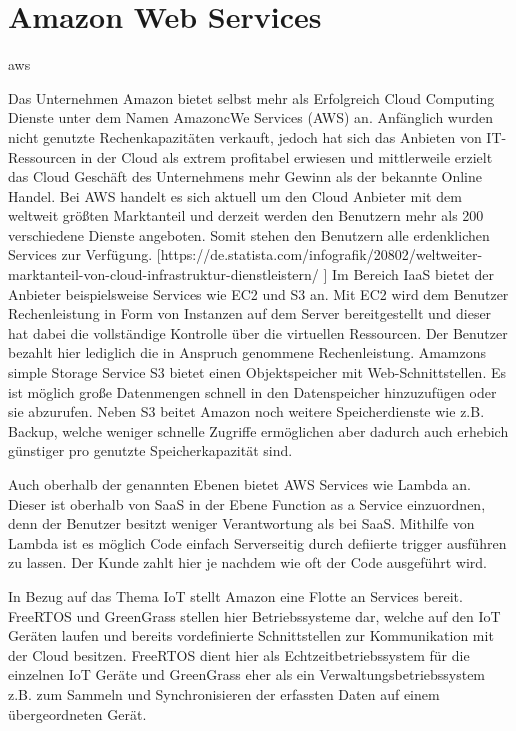 \chapter{Amazon Web Services}\label{ch:4}
\acrfull{aws}

Das Unternehmen Amazon bietet selbst mehr als Erfolgreich Cloud Computing Dienste unter dem Namen AmazoncWe Services (AWS) an. Anfänglich wurden nicht genutzte Rechenkapazitäten verkauft, jedoch hat sich das Anbieten von IT-Ressourcen in der Cloud als extrem profitabel erwiesen und mittlerweile erzielt das Cloud Geschäft des Unternehmens mehr Gewinn als der bekannte Online Handel. Bei AWS handelt es sich aktuell um den Cloud Anbieter mit dem weltweit größten Marktanteil und derzeit werden den Benutzern mehr als 200 verschiedene Dienste angeboten. Somit stehen den Benutzern alle erdenklichen Services zur Verfügung. [https://de.statista.com/infografik/20802/weltweiter-marktanteil-von-cloud-infrastruktur-dienstleistern/
] 
Im Bereich IaaS bietet der Anbieter beispielsweise Services wie EC2 und S3 an. Mit EC2 wird dem Benutzer Rechenleistung in Form von Instanzen auf dem Server bereitgestellt und dieser hat dabei die vollständige Kontrolle über die virtuellen Ressourcen. Der Benutzer bezahlt hier lediglich die in Anspruch genommene Rechenleistung. Amamzons simple Storage Service S3 bietet einen Objektspeicher mit Web-Schnittstellen. Es ist möglich große Datenmengen schnell in den Datenspeicher hinzuzufügen oder sie abzurufen. Neben S3 beitet Amazon noch weitere Speicherdienste wie z.B. Backup, welche weniger schnelle Zugriffe ermöglichen aber dadurch auch erhebich günstiger pro genutzte Speicherkapazität sind. 

Auch oberhalb der genannten Ebenen bietet AWS Services wie Lambda an. Dieser ist oberhalb von SaaS in der Ebene Function as a Service einzuordnen, denn der Benutzer besitzt weniger Verantwortung als bei SaaS. Mithilfe von Lambda ist es möglich Code einfach Serverseitig durch defiierte trigger ausführen zu lassen. Der Kunde zahlt hier je nachdem wie oft der Code ausgeführt wird.

In Bezug auf das Thema IoT stellt Amazon eine Flotte an Services bereit. FreeRTOS und GreenGrass stellen hier Betriebssysteme dar, welche auf den IoT Geräten laufen und bereits vordefinierte Schnittstellen zur Kommunikation mit der Cloud besitzen. FreeRTOS dient hier als Echtzeitbetriebssystem für die einzelnen IoT Geräte und GreenGrass eher als ein Verwaltungsbetriebssystem z.B. zum Sammeln und Synchronisieren der erfassten Daten auf einem übergeordneten Gerät.


